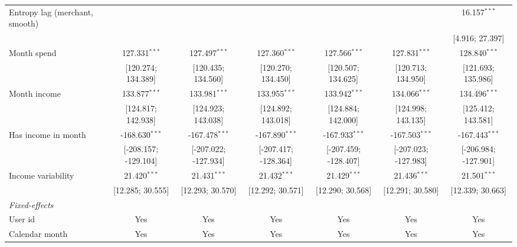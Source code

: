 \begin{table}[htbp]
\begin{threeparttable}[b]
\begin{tabular}{lcccccc}
         Entropy lag (merchant, smooth) &                      &                      &                      &                      &                      & 16.157$^{***}$\\   
                                        &                      &                      &                      &                      &                      & [4.916; 27.397]\\   
         Month spend                    & 127.331$^{***}$      & 127.497$^{***}$      & 127.360$^{***}$      & 127.566$^{***}$      & 127.831$^{***}$      & 128.840$^{***}$\\   
                                        & [120.274; 134.389]   & [120.435; 134.560]   & [120.270; 134.450]   & [120.507; 134.625]   & [120.713; 134.950]   & [121.693; 135.986]\\   
         Month income                   & 133.877$^{***}$      & 133.981$^{***}$      & 133.955$^{***}$      & 133.942$^{***}$      & 134.066$^{***}$      & 134.496$^{***}$\\   
                                        & [124.817; 142.938]   & [124.923; 143.038]   & [124.892; 143.018]   & [124.884; 142.000]   & [124.998; 143.135]   & [125.412; 143.581]\\   
         Has income in month            & -168.630$^{***}$     & -167.478$^{***}$     & -167.890$^{***}$     & -167.933$^{***}$     & -167.503$^{***}$     & -167.443$^{***}$\\   
                                        & [-208.157; -129.104] & [-207.022; -127.934] & [-207.417; -128.364] & [-207.459; -128.407] & [-207.023; -127.983] & [-206.984; -127.901]\\   
         Income variability             & 21.420$^{***}$       & 21.431$^{***}$       & 21.432$^{***}$       & 21.429$^{***}$       & 21.436$^{***}$       & 21.501$^{***}$\\   
                                        & [12.285; 30.555]     & [12.293; 30.570]     & [12.292; 30.571]     & [12.290; 30.568]     & [12.291; 30.580]     & [12.339; 30.663]\\   
         \midrule
         \emph{Fixed-effects}\\
         User id                        & Yes                  & Yes                  & Yes                  & Yes                  & Yes                  & Yes\\  
         Calendar month                 & Yes                  & Yes                  & Yes                  & Yes                  & Yes                  & Yes\\  

\end{tabular}
\end{threeparttable}
\end{table}
